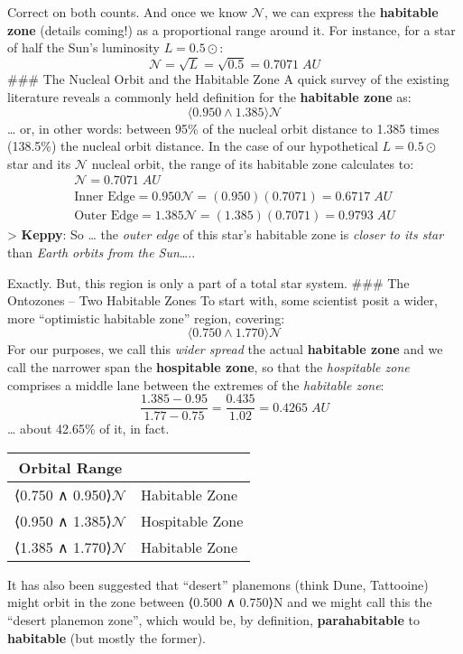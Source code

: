 \documentclass[
  letterpaper,
]{book}
\begin{document}
Correct on both counts. And once we know \emph{\(\mathcal{N}\)}, we can
express the \textbf{habitable zone} (details coming!) as a proportional
range around it. For instance, for a star of half the Sun's luminosity
\(L = 0.5⊙\): \[
\mathcal{N} = \sqrt{L} = \sqrt{0.5} = 0.7071\;AU
\] \#\#\# The Nucleal Orbit and the Habitable Zone A quick survey of the
existing literature reveals a commonly held definition for the
\textbf{habitable zone} as: \[
\langle0.950 \wedge 1.385\rangle \mathcal{N}
\] \ldots{} or, in other words: between 95\% of the nucleal orbit
distance to 1.385 times (138.5\%) the nucleal orbit distance. In the
case of our hypothetical \(L = 0.5⊙\) star and its \(\mathcal{N}\)
nucleal orbit, the range of its habitable zone calculates to: \[
\begin{gather}
\mathcal{N} = 0.7071\; AU \\
\text{Inner Edge} = 0.950 \mathcal{N} = (0.950)(0.7071) = 0.6717\; AU \\
\text{Outer Edge} = 1.385 \mathcal{N} = (1.385)(0.7071) = 0.9793\; AU
\end{gather}
\] \textgreater{} \textbf{Keppy}: So \ldots{} the \emph{outer edge} of
this star's habitable zone is \emph{closer to its star} than \emph{Earth
orbits from the Sun}\ldots..

Exactly. But, this region is only a part of a total star system. \#\#\#
The Ontozones -- Two Habitable Zones To start with, some scientist posit
a wider, more ``optimistic habitable zone'' region, covering: \[
\langle0.750 \wedge 1.770\rangle \mathcal{N}
\] For our purposes, we call this \emph{wider spread} the actual
\textbf{habitable zone} and we call the narrower span the
\textbf{hospitable zone}, so that the \emph{hospitable zone} comprises a
middle lane between the extremes of the \emph{habitable zone}: \[
\dfrac{1.385 - 0.95}{1.77 - 0.75} = \dfrac{0.435}{1.02} = 0.4265\;AU
\] \ldots{} about 42.65\% of it, in fact.

\begin{longtable}[]{@{}cl@{}}
\toprule\noalign{}
Orbital Range & \\
\midrule\noalign{}
\endhead
\bottomrule\noalign{}
\endlastfoot
⟨0.750 ∧ 0.950⟩\(\mathcal{N}\) & Habitable Zone \\
⟨0.950 ∧ 1.385⟩\(\mathcal{N}\) & Hospitable Zone \\
⟨1.385 ∧ 1.770⟩\(\mathcal{N}\) & Habitable Zone \\
\end{longtable}

It has also been suggested that ``desert'' planemons (think Dune,
Tattooine) might orbit in the zone between ⟨0.500 ∧ 0.750⟩N and we might
call this the ``desert planemon zone'', which would be, by definition,
\textbf{parahabitable} to \textbf{habitable} (but mostly the former).
\end{document}
